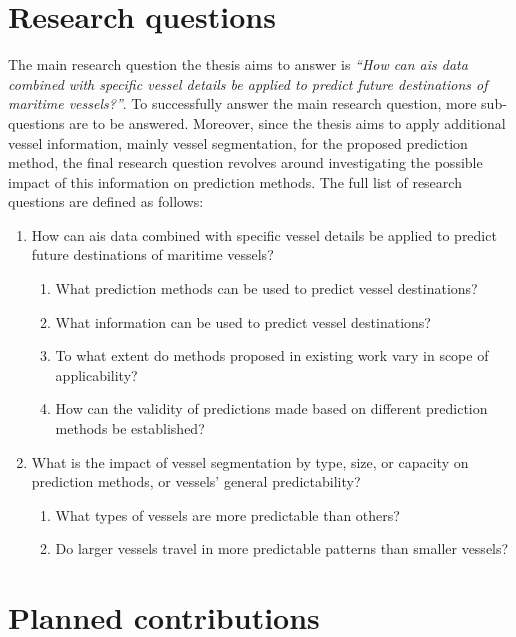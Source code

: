 \section{Research questions}
\label{sec:research_questions}

The main research question the thesis aims to answer is \textit{``How can \acrshort{ais} data combined with specific vessel details be applied to predict future destinations of maritime vessels?''}. To successfully answer the main research question, more sub-questions are to be answered. Moreover, since the thesis aims to apply additional vessel information, mainly vessel segmentation, for the proposed prediction method, the final research question revolves around investigating the possible impact of this information on prediction methods. The full list of research questions are defined as follows:

\begin{enumerate}
    \item How can \acrshort{ais} data combined with specific vessel details be applied to predict future destinations of maritime vessels?
    \begin{enumerate}
    \item What prediction methods can be used to predict vessel destinations?
    \item What information can be used to predict vessel destinations?
    \item To what extent do methods proposed in existing work vary in scope of applicability?
    \item How can the validity of predictions made based on different prediction methods be established?
    \end{enumerate}
    \item What is the impact of vessel segmentation by type, size, or capacity on prediction methods, or vessels' general predictability?
    \begin{enumerate}
    \item What types of vessels are more predictable than others?
    \item Do larger vessels travel in more predictable patterns than smaller vessels?
    \end{enumerate}
\end{enumerate}

\section{Planned contributions}

